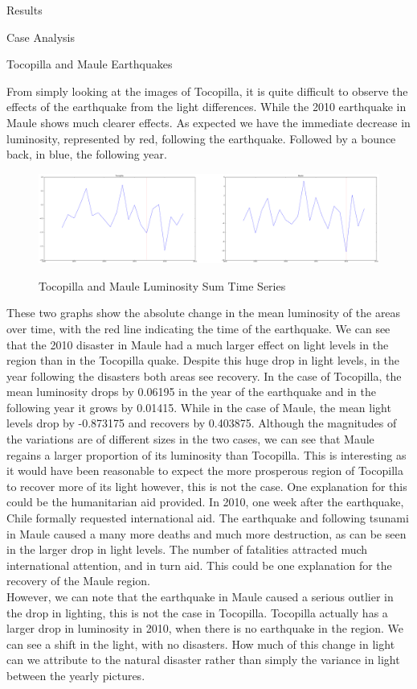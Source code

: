 \documentclass[12.5pt,fleqn,leqno,letterpaper]{article}
\begin{document}
\begin{section}{Results}
\begin{subsection}{Case Analysis}
\begin{subsubsection}{Tocopilla and Maule Earthquakes}
\begin{figure}[H]
      \end{figure}
      From simply looking at the images of Tocopilla, it is quite difficult to observe the effects of the earthquake from the light differences. While the 2010 earthquake in Maule shows much clearer effects. As expected we have the immediate decrease in luminosity, represented by red, following the earthquake. Followed by a bounce back, in blue, the following year. \\
      \begin{figure}[H]
        \centering
        \includegraphics[width=1\linewidth]{maule_tocopilla}\label{fig:maule_tocopilla}
        \caption{Tocopilla and Maule Luminosity Sum Time Series}
      \end{figure}
      These two graphs show the absolute change in the mean luminosity of the areas over time, with the red line indicating the time of the earthquake. We can see that the 2010 disaster in Maule had a much larger effect on light levels in the region than in the Tocopilla quake. Despite this huge drop in light levels, in the year following the disasters both areas see recovery. In the case of Tocopilla, the mean luminosity drops by 0.06195 in the year of the earthquake and in the following year it grows by 0.01415. While in the case of Maule, the mean light levels drop by -0.873175 and recovers by 0.403875. Although the magnitudes of the variations are of different sizes in the two cases, we can see that Maule regains a larger proportion of its luminosity than Tocopilla. This is interesting as it would have been reasonable to expect the more prosperous region of Tocopilla to recover more of its light however, this is not the case. One explanation for this could be the humanitarian aid provided. In 2010, one week after the earthquake, Chile formally requested international aid. The earthquake and following tsunami in Maule caused a many more deaths and much more destruction, as can be seen in the larger drop in light levels. The number of fatalities attracted much international attention, and in turn aid. This could be one explanation for the recovery of the Maule region. \\
      However, we can note that the earthquake in Maule caused a serious outlier in the drop in lighting, this is not the case in Tocopilla. Tocopilla actually has a larger drop in luminosity in 2010, when there is no earthquake in the region. We can see a shift in the light, with no disasters. How much of this change in light can we attribute to the natural disaster rather than simply the variance in light between the yearly pictures.
    \end{subsubsection}


\end{subsection}
\end{section}
\end{document}
